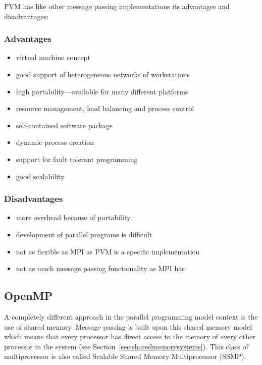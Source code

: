 PVM has like other message passing implementations its advantages and
disadvantages:

\subsubsection{Advantages}
\begin{itemize}
\item virtual machine concept
\item good support of heterogeneous networks of workstations
\item high portability---available for many different platforms
\item resource management, load balancing and process control
\item self-contained software package
\item dynamic process creation
\item support for fault tolerant programming
\item good scalability
\end{itemize}

\subsubsection{Disadvantages}
\begin{itemize}
\item more overhead because of portability
\item development of parallel programs is difficult
\item not as flexible as MPI as PVM is a specific implementation
\item not as much message passing functionality as MPI has
\end{itemize}

\subsection{OpenMP}
\label{sec:OpenMP}

A completely different approach in the parallel programming model
context is the use of shared memory. Message passing is built upon
this shared memory model which means that every processor has direct
access to the memory of every other processor in the system
(see Section~\ref{sec:sharedmemorysystems}). This class of
multiprocessor is also called Scalable Shared Memory Multiprocessor
(SSMP).

